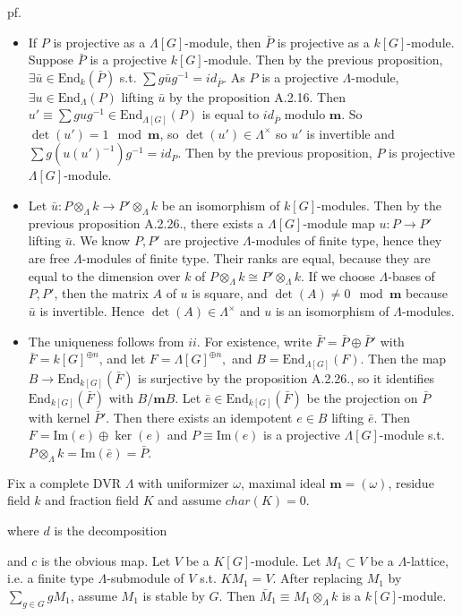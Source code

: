 \documentclass[12pt,letterpaper]{report}
\begin{document}
pf.\begin{itemize}\item If $P$ is projective as a $\Lambda[G]$-module, then $\bar{P}$ is projective as a $k[G]$-module. 
\\Suppose $\bar{P}$ is a projective $k[G]$-module. Then by the previous proposition, $\exists \bar{u}\in \text{End}_{k}(\bar{P})$ s.t. $\sum g\bar{u}g^{-1}=id_{\bar{P}}$. As $P$ is a projective $\Lambda$-module, $\exists u\in\text{End}_{\Lambda}(P)$ lifting $\bar{u}$ by the proposition A.2.16. Then $u'\equiv\sum gug^{-1}\in\text{End}_{\Lambda[G]}(P)$ is equal to $id_{\bar{P}}$ modulo $\mathbf{m}$. So $\det(u')=1\mod\mathbf{m}$, so $\det(u')\in\Lambda^{\times}$ so $u'$ is invertible and $\sum g(u(u')^{-1})g^{-1}=id_{P}$. Then by the previous proposition, $P$ is projective $\Lambda[G]$-module.
\item Let $\bar{u}:P\otimes_{\Lambda}k\rightarrow P'\otimes_{\Lambda}k$ be an isomorphism of $k[G]$-modules. Then by the previous proposition A.2.26., there exists a $\Lambda[G]$-module map $u:P\rightarrow P'$ lifting $\bar{u}$. We know $P,P'$ are projective $\Lambda$-modules of finite type, hence they are free $\Lambda$-modules of finite type. Their ranks are equal, because they are equal to the dimension over $k$ of $P\otimes_{\Lambda}k\cong P'\otimes_{\Lambda}k$. If we choose $\Lambda$-bases of $P,P'$, then the matrix $A$ of $u$ is square, and $\det(A)\neq0\mod\mathbf{m}$ because $\bar{u}$ is invertible. Hence $\det(A)\in\Lambda^{\times}$ and $u$ is an isomorphism of $\Lambda$-modules.
\item The uniqueness follows from $ii$. For existence, write $\bar{F}=\bar{P}\oplus\bar{P}'$ with $\bar{F}=k[G]^{\oplus n}$, and let $F=\Lambda[G]^{\oplus n},$ and $B=\text{End}_{\Lambda[G]}(F)$. Then the map $B\rightarrow\text{End}_{k[G]}(\bar{F})$ is surjective by the proposition A.2.26., so it identifies $\text{End}_{k[G]}(\bar{F})$ with $B/\mathbf{m}B$. Let $\bar{e}\in\text{End}_{k[G]}(\bar{F})$ be the projection on $\bar{P}$ with kernel $\bar{P}'$. Then there exists an idempotent $e\in B$ lifting $\bar{e}$. Then $F=\text{Im}(e)\oplus \ker(e)$ and $P\equiv \text{Im}(e)$ is a projective $\Lambda[G]$-module s.t. $P\otimes_{\Lambda}k=\text{Im}(\bar{e})=\bar{P}$.




\end{itemize}
\indent Fix a complete DVR $\Lambda$ with uniformizer $\omega$, maximal ideal $\mathbf{m}=(\omega)$, residue field $k$ and fraction field $K$ and assume $char(K)=0$.  where $d$ is the decomposition  and $c$ is the obvious map. Let $V$ be a $K[G]$-module. Let $M_{1}\subset V$ be a $\Lambda$-lattice, i.e. a finite type $\Lambda$-submodule of $V$ s.t. $KM_{1}=V$. After replacing $M_{1}$ by $\sum_{g\in G}gM_{1}$, assume $M_{1}$ is stable by $G$. Then $\bar{M}_{1}\equiv M_{1}\otimes_{\Lambda}k$ is a $k[G]$-module. 
\end{document}
